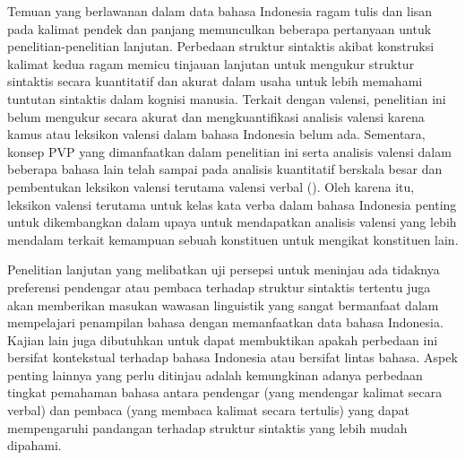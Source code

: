 Temuan yang berlawanan dalam data bahasa Indonesia ragam tulis dan lisan pada kalimat pendek dan panjang memunculkan beberapa pertanyaan untuk penelitian-penelitian lanjutan. Perbedaan struktur sintaktis akibat konstruksi kalimat kedua ragam memicu tinjauan lanjutan untuk mengukur struktur sintaktis secara kuantitatif dan akurat dalam usaha untuk lebih memahami tuntutan sintaktis dalam kognisi manusia. Terkait dengan valensi, penelitian ini belum mengukur secara akurat dan mengkuantifikasi analisis valensi karena kamus atau leksikon valensi dalam bahasa Indonesia belum ada. Sementara, konsep PVP \citep{liu2006syntactic} yang dimanfaatkan dalam penelitian ini serta analisis valensi dalam beberapa bahasa lain telah sampai pada analisis kuantitatif berskala besar dan pembentukan leksikon valensi terutama valensi verbal (\citealp{zabokrtsky2005valency, bielicky2008building, passarotti2016latin, semecky2006constructing}). Oleh karena itu, leksikon valensi terutama untuk kelas kata verba dalam bahasa Indonesia penting untuk dikembangkan dalam upaya untuk mendapatkan analisis valensi yang lebih mendalam terkait kemampuan sebuah konstituen untuk mengikat konstituen lain. 

Penelitian lanjutan yang melibatkan uji persepsi untuk meninjau ada tidaknya preferensi pendengar atau pembaca terhadap struktur sintaktis tertentu juga akan memberikan masukan wawasan linguistik yang sangat bermanfaat dalam mempelajari penampilan bahasa dengan memanfaatkan data bahasa Indonesia. Kajian lain juga dibutuhkan untuk dapat membuktikan apakah perbedaan ini bersifat kontekstual terhadap bahasa Indonesia atau bersifat lintas bahasa. Aspek penting lainnya yang perlu ditinjau adalah kemungkinan adanya perbedaan tingkat pemahaman bahasa antara pendengar (yang mendengar kalimat secara verbal) dan pembaca (yang membaca kalimat secara tertulis) yang dapat mempengaruhi pandangan terhadap struktur sintaktis yang lebih mudah dipahami. 